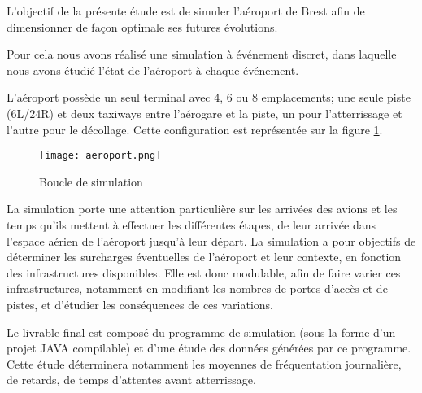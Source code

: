 L’objectif de la présente étude est de simuler l’aéroport de Brest afin de dimensionner de façon optimale ses futures évolutions. 

Pour cela nous avons réalisé une simulation à événement discret, dans laquelle nous avons étudié l'état de l'aéroport à chaque événement.

L'aéroport possède un seul terminal avec 4, 6 ou 8 emplacements; une seule piste (6L/24R) et deux taxiways entre l'aérogare et la piste, un pour l'atterrissage et l'autre pour le décollage. Cette configuration est représentée sur la figure \ref{aeroport}.

\begin{figure}[h]
	\centering
 	\texttt{[image: aeroport.png]}
	\caption{\label{aeroport} Boucle de simulation}
\end{figure}

La simulation porte une attention particulière sur les arrivées des avions et les temps qu'ils mettent à effectuer les différentes étapes, de leur arrivée dans l'espace aérien de l'aéroport jusqu'à leur départ.
La simulation a pour objectifs de déterminer les surcharges éventuelles de l’aéroport et leur contexte, en fonction des infrastructures disponibles.
Elle est donc modulable, afin de faire varier ces infrastructures, notamment en modifiant les nombres de portes d’accès et de pistes, et d’étudier les conséquences de ces variations.


Le livrable final est composé du programme de simulation (sous la forme d'un projet JAVA compilable) et d'une étude des données générées par ce programme. Cette étude déterminera notamment les moyennes de fréquentation journalière, de retards, de temps d'attentes avant atterrissage.
